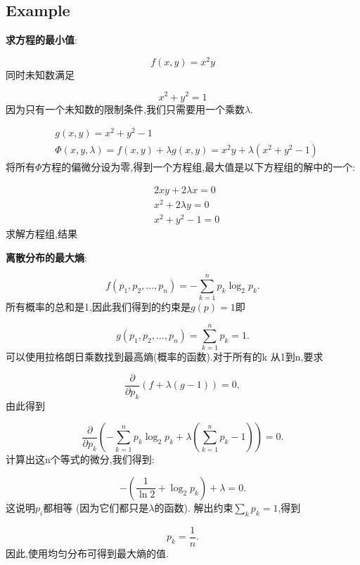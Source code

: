 \documentclass{article}
\begin{document}
\subsection{Example}
\begin{example}
\textbf{求方程的最小值}:

$$ f(x, y) = x^2 y $$
同时未知数满足

$$ x^2 + y^2 = 1 $$
因为只有一个未知数的限制条件,我们只需要用一个乘数$\lambda$.

$$
\begin{aligned}
		& g (x, y) = x^2 +y^2 -1 \\
		& \Phi (x, y, \lambda) = f(x,y) + \lambda g(x, y) = x^2 y + \lambda (x^2 + y^2 - 1)
\end{aligned}
$$
将所有$\Phi$方程的偏微分设为零,得到一个方程组,最大值是以下方程组的解中的一个:

$$
\begin{aligned}
		& 2 x y + 2 \lambda x = 0 \\
		& x^2 + 2 \lambda y = 0 \\
		& x^2 + y^2 -1 = 0
\end{aligned}
$$
求解方程组,结果
\end{example}

\begin{example}
\textbf{离散分布的最大熵}:

$$ f(p_1,p_2,\ldots,p_n) = -\sum_{k=1}^n p_k\log_2 p_k.  $$
所有概率的总和是1,因此我们得到的约束是$g(p)= 1$即

$$ g(p_1,p_2,\ldots,p_n)=\sum_{k=1}^n p_k=1.  $$
可以使用拉格朗日乘数找到最高熵(概率的函数).对于所有的k 从1到n,要求

$$ \frac{\partial}{\partial p_k}(f+\lambda (g-1))=0, $$
由此得到

$$ \frac{\partial}{\partial p_k}\left(-\sum_{k=1}^n p_k \log_2 p_k + \lambda (\sum_{k=1}^n p_k - 1) \right) = 0.  $$
计算出这n个等式的微分,我们得到:

$$ -\left(\frac{1}{\ln 2}+\log_2 p_k \right) + \lambda = 0.  $$
这说明$p_i$都相等 (因为它们都只是$\lambda$的函数). 解出约束$\sum_k p_k = 1$,得到

$$ p_k = \frac{1}{n}.$$
因此,使用均匀分布可得到最大熵的值.
\end{example}
\end{document}
